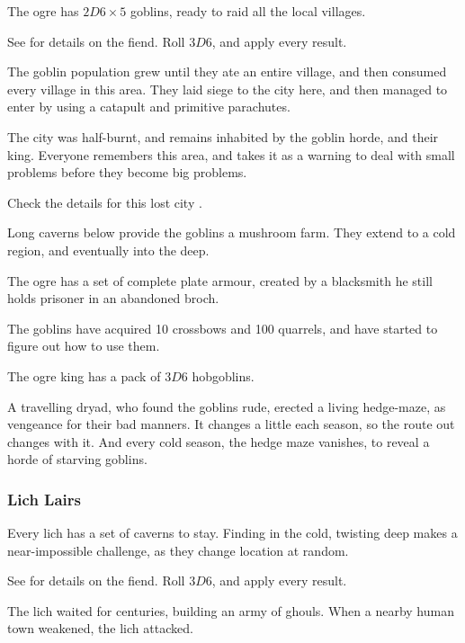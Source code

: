 \begin{multicols}{2}
The \gls{ogre} has $2D6 \times 5$ goblins, ready to raid all the local \glspl{village}.

See  for details on the fiend.
Roll $3D6$, and apply every result.

\begin{dlist}
  \item
  The goblin population grew until they ate an entire \gls{village}, and then consumed every \gls{village} in this area.
  They laid siege to the city here, and then managed to enter by using a catapult and primitive parachutes.

  The city was half-burnt, and remains inhabited by the goblin horde, and their king.
  Everyone remembers this area, and takes it as a warning to deal with small problems before they become big problems.

  Check the details for this lost city .
  \item
  Long caverns below provide the goblins a mushroom farm.
  They extend to a cold region, and eventually into the \gls{deep}.
  \item
  The \gls{ogre} has a set of complete plate armour, created by a blacksmith he still holds prisoner in an abandoned \gls{broch}.
  \item
  The goblins have acquired 10 crossbows and 100 quarrels, and have started to figure out how to use them.
  \item
  The \gls{ogre} king has a pack of $3D6$ hobgoblins.
  \item
  A travelling dryad, who found the goblins rude, erected a living hedge-maze, as vengeance for their bad manners.
  It changes a little each season, so the route out changes with it.
  And every cold season, the hedge maze vanishes, to reveal a horde of starving goblins.
\end{dlist}

\subsubsection{Lich Lairs}
\label{lichPoint}

Every \gls{lich} has a set of caverns to stay.
Finding  in the cold, twisting \gls{deep} makes a near-impossible challenge, as they change location at random.

See  for details on the fiend.
Roll $3D6$, and apply every result.

\begin{dlist}
  \item
  The \gls{lich} waited for centuries, building an army of ghouls.
  When a nearby human town weakened, the \gls{lich} attacked.


\end{dlist}
\end{multicols}
